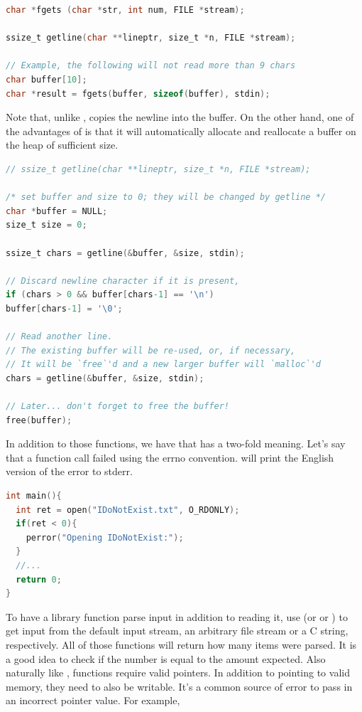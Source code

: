 \begin{lstlisting}[language=C]
char *fgets (char *str, int num, FILE *stream);

ssize_t getline(char **lineptr, size_t *n, FILE *stream);

// Example, the following will not read more than 9 chars
char buffer[10];
char *result = fgets(buffer, sizeof(buffer), stdin);
\end{lstlisting}

Note that, unlike ,  copies the newline into the buffer.
On the other hand, one of the advantages of  is that it will automatically allocate and reallocate a buffer on the heap of sufficient size.

\begin{lstlisting}[language=C]
// ssize_t getline(char **lineptr, size_t *n, FILE *stream);

/* set buffer and size to 0; they will be changed by getline */
char *buffer = NULL;
size_t size = 0;

ssize_t chars = getline(&buffer, &size, stdin);

// Discard newline character if it is present,
if (chars > 0 && buffer[chars-1] == '\n')
buffer[chars-1] = '\0';

// Read another line.
// The existing buffer will be re-used, or, if necessary,
// It will be `free`'d and a new larger buffer will `malloc`'d
chars = getline(&buffer, &size, stdin);

// Later... don't forget to free the buffer!
free(buffer);
\end{lstlisting}

In addition to those functions, we have  that has a two-fold meaning.
Let's say that a function call failed using the errno convention.
 will print the English version of the error to stderr.

\begin{lstlisting}[language=C]
int main(){
  int ret = open("IDoNotExist.txt", O_RDONLY);
  if(ret < 0){
    perror("Opening IDoNotExist:");
  }
  //...
  return 0;
}
\end{lstlisting}

To have a library function parse input in addition to reading it, use  (or  or ) to get input from the default input stream, an arbitrary file stream or a C string, respectively.
All of those functions will return how many items were parsed.
It is a good idea to check if the number is equal to the amount expected.
Also naturally like ,  functions require valid pointers.
In addition to pointing to valid memory, they need to also be writable.
It's a common source of error to pass in an incorrect pointer value.
For example,

